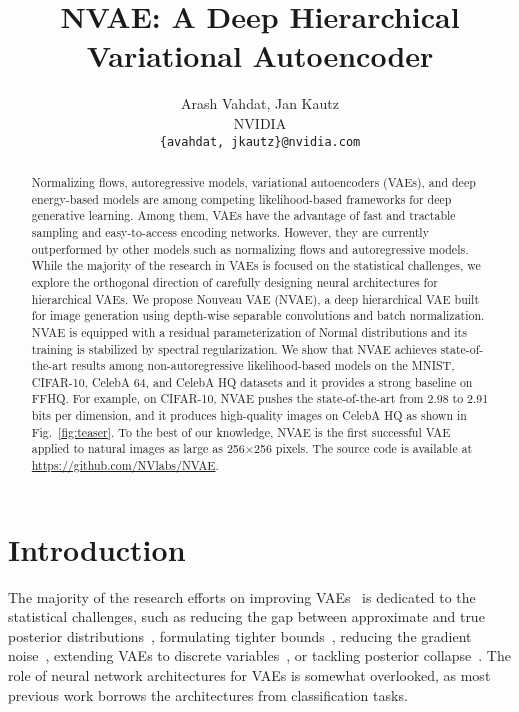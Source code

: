 \documentclass{article}
\title{NVAE: A Deep Hierarchical Variational Autoencoder }
\author{Arash Vahdat, Jan Kautz \\
  NVIDIA \\
  \texttt{\{avahdat,  jkautz\}@nvidia.com} \\
}
\begin{document}
\maketitle

\begin{abstract}
Normalizing flows, autoregressive models, variational autoencoders (VAEs), and deep energy-based models are among competing likelihood-based frameworks for deep generative learning. Among them, VAEs have the advantage of fast and tractable sampling and easy-to-access encoding networks. However, they are currently outperformed by other models such as normalizing flows and autoregressive models. While the majority of the research in VAEs is focused on the statistical challenges, we explore the orthogonal direction of carefully designing neural architectures for hierarchical VAEs. We propose Nouveau VAE (NVAE), a deep hierarchical VAE built for image generation using depth-wise separable convolutions and batch normalization. NVAE is equipped with a residual parameterization of Normal distributions and its training is stabilized by spectral regularization. We show that NVAE achieves state-of-the-art results among non-autoregressive likelihood-based models on the MNIST, CIFAR-10, CelebA 64, and CelebA HQ datasets and it provides a strong baseline on FFHQ. For example, on CIFAR-10, NVAE pushes the state-of-the-art from 2.98 to 2.91 bits per dimension, and it produces high-quality images on CelebA HQ as shown in Fig.~\ref{fig:teaser}. To the best of our knowledge, NVAE is the first successful VAE applied to natural images as large as 256$\times$256 pixels. The source code is available at {\color{blue}\url{https://github.com/NVlabs/NVAE}}.
 \end{abstract}
\section{Introduction}
The majority of the research efforts on improving VAEs~\cite{kingma2014vae, rezende2014stochastic} is dedicated to the statistical challenges, such as reducing the gap between approximate and true posterior distributions~\cite{rezendeICML15Normalizing, kingma2016improved, gregor2015draw, cremer18amortization, marino18amortized, maaloe16auxiliary, ranganath16hierarchical, vahdat2019UndirectedPost}, formulating tighter bounds~\cite{burda2015importance, li2016renyi, bornschein2016bidirectional, masrani2019thermodynamic}, reducing the gradient noise~\cite{roeder2017sticking, tucker2018doubly}, extending VAEs to discrete variables~\cite{maddison2016concrete, jang2016categorical, rolfe2016discrete, Vahdat2018DVAE++, vahdat2018dvaes, tucker2017rebar, grathwohl2017backpropagation}, or tackling posterior collapse~\cite{bowman2016generating, razavi2019collapse, gulrajani2016pixelvae,lucas2019collapse}. The role of neural network architectures for VAEs is somewhat overlooked, as most previous work borrows the architectures from classification tasks. 
\end{document}

